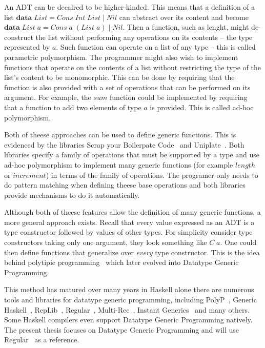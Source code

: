 \documentclass[8pt]{extarticle}
\newcommand{\Conid}[1]{\mathit{#1}}
\newcommand{\Varid}[1]{\mathit{#1}}
\begin{document}
An ADT can be decalred to be higher-kinded. This means that a
definition of a list \ensuremath{\mathbf{data}\;\Conid{List}\mathrel{=}\Conid{Cons}\;\Conid{Int}\;\Conid{List}\;|\;\Conid{Nil}} can abstract
over its content and become \ensuremath{\mathbf{data}\;\Conid{List}\;\Varid{a}\mathrel{=}\Conid{Cons}\;\Varid{a}\;(\Conid{List}\;\Varid{a})\;|\;\Conid{Nil}}. Then a function, such as lenght, might de-construct the list
without performing any operations on its contents -- the type
represented by \ensuremath{\Varid{a}}. Such function can operate on a list of any type --
this is called parametric polymorphism. The programmer might also wish
to implement functions that operate on the contents of a list without
restricting the type of the list's content to be monomorphic. This can
be done by requiring that the function is also provided with a set of
operations that can be performed on its argument. For example, the
\ensuremath{\Varid{sum}} function could be implemented by requiring that a function to
add two elements of type \ensuremath{\Varid{a}} is provided. This is called ad-hoc
polymorphism.

Both of theese approaches can be used to define generic
functions. This is evidenced by the libraries Scrap your Boilerpate
Code~\cite{SYB} and Uniplate~\cite{Uniplate}. Both libraries specify a
family of operations that must be supported by a type and use ad-hoc
polymorphism to implement many generic functions (for example \ensuremath{\Varid{length}}
or \ensuremath{\Varid{increment}}) in terms of the family of operations. The programer
only needs to do pattern matching when defining theese base operations
and both libraries provide mechanisms to do it automatically.

Although both of theese features allow the definition of many generic
functions, a more general approach exists. Recall that every value
expressed as an ADT is a type constructor followed by values of other
types. For simplicity consider type constructors taking only one
argument, they look something like \ensuremath{\Conid{C}\;\Varid{a}}. One could then define
functions that generalize over \emph{every} type constructor. This is
the idea behind polytipic programming~\cite{polyp} which later evolved
into Datatype Generic Programming.

This method has matured over many years in Haskell alone there are
numerous tools and libraries for datatype generic programming,
including PolyP~\cite{polyp}, Generic Haskell~\cite{GenericHaskell},
RepLib~\cite{RepLib}, Regular~\cite{Regular},
Multi-Rec~\cite{multirec}, Instant Generics~\cite{instant2} and many
others. Some Haskell compilers even support Datatype Generic
Programming natively. The present thesis focuses on Datatype Generic
Programming and will use Regular~\cite{Regular} as a reference.
\end{document}
